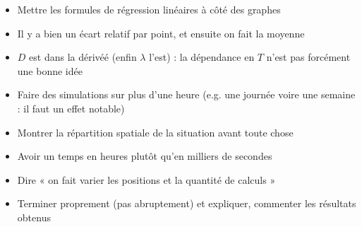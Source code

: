 \documentclass{article}
\begin{document}
\begin{itemize}
    \item Mettre les formules de régression linéaires à côté des graphes
    \item Il y a bien un écart relatif par point, et ensuite on fait la moyenne
    \item $D$ est dans la dérivéé (enfin $\lambda$ l'est) : la dépendance en $T$ n'est pas forcément une bonne idée
    \item Faire des simulations sur plus d'une heure (e.g. une journée voire une semaine : il faut un effet notable)
    \item Montrer la répartition spatiale de la situation avant toute chose
    \item Avoir un temps en heures plutôt qu'en milliers de secondes
    \item Dire « on fait varier les positions et la quantité de calculs »
    \item Terminer proprement (pas abruptement) et expliquer, commenter les résultats obtenus
\end{itemize}
\end{document}
